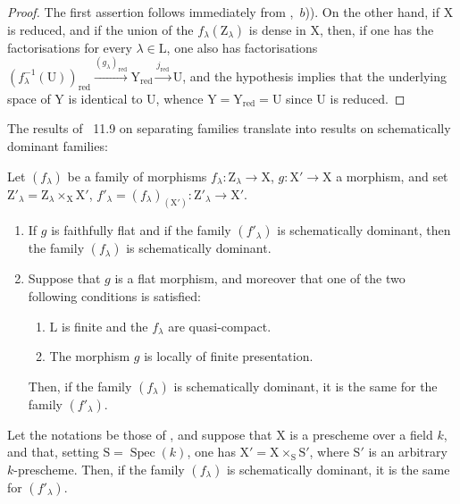 \begin{proof}
The first assertion follows immediately from ,~$b$)).
On the other hand, if $\mathrm{X}$ is reduced, and if the union of the $f_\lambda(\mathrm{Z}_\lambda)$ is dense in $\mathrm{X}$, then, if one has the factorisations  for every $\lambda\in\mathrm{L}$, one also has factorisations $(f_\lambda^{-1}(\mathrm{U}))_\mathrm{red}\xrightarrow{(g_\lambda)_\mathrm{red}}\mathrm{Y}_\mathrm{red}\xrightarrow{j_\mathrm{red}}\mathrm{U}$, and the hypothesis implies that the underlying space of $\mathrm{Y}$ is identical to $\mathrm{U}$, whence $\mathrm{Y}=\mathrm{Y}_\mathrm{red}=\mathrm{U}$ since $\mathrm{U}$ is reduced.
\end{proof}

The results of \textsection~11.9 on separating families translate into results on schematically dominant families:

\begin{theorem}[11.10.5]
\label{IV.11.10.5}
Let $(f_\lambda)$ be a family of morphisms $f_\lambda:\mathrm{Z}_\lambda\to\mathrm{X}$, $g:\mathrm{X}'\to\mathrm{X}$ a morphism, and set $\mathrm{Z}'_\lambda=\mathrm{Z}_\lambda\times_\mathrm{X}\mathrm{X}'$, $f'_\lambda=(f_\lambda)_{(\mathrm{X}')}:\mathrm{Z}'_\lambda\to\mathrm{X}'$.
\begin{enumerate}[label=(\roman*)]
  \item If $g$ is faithfully flat and if the family $(f'_\lambda)$ is schematically dominant, then the family $(f_\lambda)$ is schematically dominant.
  \item Suppose that $g$ is a flat morphism, and moreover that one of the two following conditions is satisfied:
  \begin{enumerate}[label=\emph{\alph*)}]
    \item $\mathrm{L}$ is finite and the $f_\lambda$ are quasi-compact.
    \item The morphism $g$ is locally of finite presentation.
  \end{enumerate}
  Then, if the family $(f_\lambda)$ is schematically dominant, it is the same for the family $(f'_\lambda)$.
\end{enumerate}
\end{theorem}

\begin{proposition}[11.10.6]
\label{IV.11.10.6}
Let the notations be those of , and suppose that $\mathrm{X}$ is a prescheme over a field $k$, and that, setting $\mathrm{S}=\operatorname{Spec}(k)$, one has $\mathrm{X}'=\mathrm{X}\times_\mathrm{S}\mathrm{S}'$, where $\mathrm{S}'$ is an arbitrary $k$-prescheme.
Then, if the family $(f_\lambda)$ is schematically dominant, it is the same for $(f'_\lambda)$.
\end{proposition}

